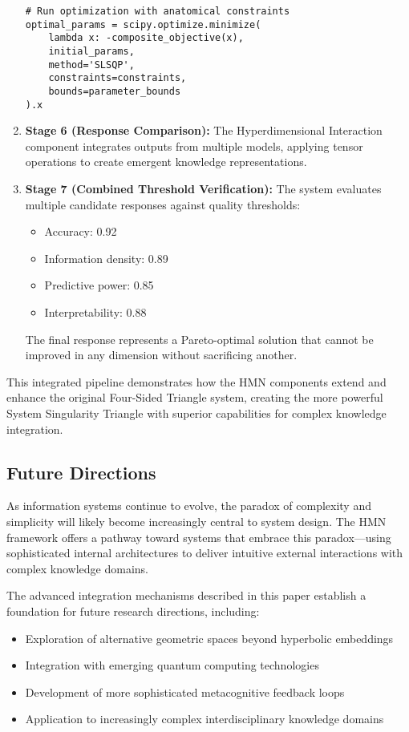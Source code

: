 \documentclass[journal,onecolumn]{IEEEtran}
\begin{document}
\begin{enumerate}
\begin{lstlisting}[caption={Parameter Optimization Process}, label={lst:optimization}]
# Run optimization with anatomical constraints
optimal_params = scipy.optimize.minimize(
    lambda x: -composite_objective(x),
    initial_params,
    method='SLSQP',
    constraints=constraints,
    bounds=parameter_bounds
).x
\end{lstlisting}

\item \textbf{Stage 6 (Response Comparison):} The Hyperdimensional Interaction component integrates outputs from multiple models, applying tensor operations to create emergent knowledge representations.

\item \textbf{Stage 7 (Combined Threshold Verification):} The system evaluates multiple candidate responses against quality thresholds:
\begin{itemize}
    \item Accuracy: 0.92
    \item Information density: 0.89
    \item Predictive power: 0.85
    \item Interpretability: 0.88
\end{itemize}
The final response represents a Pareto-optimal solution that cannot be improved in any dimension without sacrificing another.
\end{enumerate}

This integrated pipeline demonstrates how the HMN components extend and enhance the original Four-Sided Triangle system, creating the more powerful System Singularity Triangle with superior capabilities for complex knowledge integration.

\subsection{Future Directions}

As information systems continue to evolve, the paradox of complexity and simplicity will likely become increasingly central to system design. The HMN framework offers a pathway toward systems that embrace this paradox—using sophisticated internal architectures to deliver intuitive external interactions with complex knowledge domains.

The advanced integration mechanisms described in this paper establish a foundation for future research directions, including:

\begin{itemize}
\item Exploration of alternative geometric spaces beyond hyperbolic embeddings
\item Integration with emerging quantum computing technologies
\item Development of more sophisticated metacognitive feedback loops
\item Application to increasingly complex interdisciplinary knowledge domains
\end{itemize}
\end{document}
